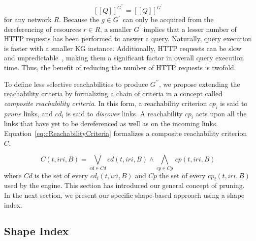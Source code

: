 \begin{equation}\label{eq:evalQueryStructuralAssumption}
   [\![ Q ]\!]^{G^{\prime\prime}} = [\![ Q ]\!]^{G^{\prime}}
\end{equation}
for any network $R$.
Because the $g \in G^{\prime}$ can only be acquired from the dereferencing of resources $r \in R$, a smaller $G^\prime$ implies that a lesser number of HTTP requests has been performed to answer a query.
Naturally, query execution is faster with a smaller KG instance.
Additionally, HTTP requests can be slow and unpredictable~\cite{hartig2016walking}, making them a significant factor in overall query execution time. 
Thus, the benefit of reducing the number of HTTP requests is twofold.

To define less selective reachabilities to produce $G^{\prime\prime}$, we propose extending the reachability criteria by formalizing a chain of criteria in a concept called \emph{composite reachability criteria}.
In this form, a reachability criterion $cp_i$ is said to \emph{prune} links, and $cd_i$ is said to \emph{discover} links.
A reachability $cp_i$ acts upon all the links that have yet to be dereferenced as well as on the incoming links.
Equation~\ref{eq:cReachabilityCriteria} formalizes a composite reachability criterion $C$.

\begin{equation}\label{eq:cReachabilityCriteria}
   C(t, iri, B) = \bigvee_{cd \in Cd} cd(t, iri, B) \mathrel{\land} \bigwedge_{cp \in Cp} \, cp(t, iri, B)
\end{equation}
where $Cd$ is the set of every $cd_i(t, iri, B)$ and $Cp$ the set of every $cp_i(t, iri, B)$ used by the engine.
This section has introduced our general concept of pruning. 
In the next section, we present our specific shape-based approach using a shape index.

\subsection{Shape Index}

